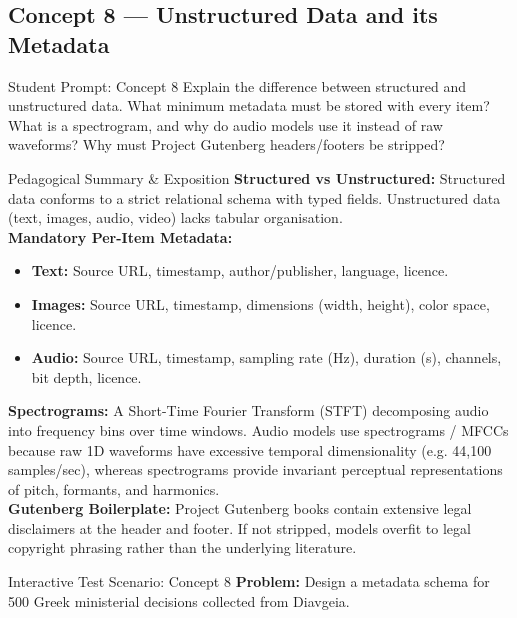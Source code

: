 \documentclass[11pt,a4paper]{article}
\begin{document}
\subsection{Concept 8 --- Unstructured Data and its Metadata}
\begin{promptbox}{Student Prompt: Concept 8}
Explain the difference between structured and unstructured data. What minimum metadata must be stored with every item? What is a spectrogram, and why do audio models use it instead of raw waveforms? Why must Project Gutenberg headers/footers be stripped?
\end{promptbox}

\begin{evalbox}{Pedagogical Summary \& Exposition}
\textbf{Structured vs Unstructured:} Structured data conforms to a strict relational schema with typed fields. Unstructured data (text, images, audio, video) lacks tabular organisation.\\
\textbf{Mandatory Per-Item Metadata:}
\begin{itemize}
    \item \textbf{Text:} Source URL, timestamp, author/publisher, language, licence.
    \item \textbf{Images:} Source URL, timestamp, dimensions (width, height), color space, licence.
    \item \textbf{Audio:} Source URL, timestamp, sampling rate (Hz), duration (s), channels, bit depth, licence.
\end{itemize}
\textbf{Spectrograms:} A Short-Time Fourier Transform (STFT) decomposing audio into frequency bins over time windows. Audio models use spectrograms / MFCCs because raw 1D waveforms have excessive temporal dimensionality (e.g. 44,100 samples/sec), whereas spectrograms provide invariant perceptual representations of pitch, formants, and harmonics.\\
\textbf{Gutenberg Boilerplate:} Project Gutenberg books contain extensive legal disclaimers at the header and footer. If not stripped, models overfit to legal copyright phrasing rather than the underlying literature.
\end{evalbox}

\begin{testbox}{Interactive Test Scenario: Concept 8}
\textbf{Problem:} Design a metadata schema for 500 Greek ministerial decisions collected from Diavgeia.
\end{testbox}
\end{document}
